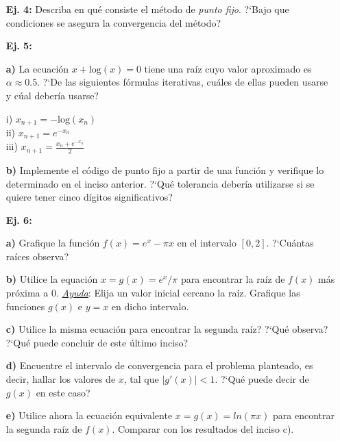 \documentclass[11pt]{article}
\begin{document}
\begin{itemize}
\item[{\bf Ej. 4:}] Describa en qu\'e consiste el m\'etodo de \textit{punto fijo}. ?`Bajo que condiciones se asegura la convergencia del m\'etodo?

\item[{\bf Ej. 5:}] 

\item [{\bf a)}] La ecuaci\'on $x + \mathrm{log}(x) = 0$ tiene una ra\'iz cuyo valor aproximado es $\alpha \approx 0.5$. ?`De las siguientes f\'ormulas iterativas, cu\'ales de ellas pueden usarse y c\'ual deber\'ia usarse?
  
     i) $x_{n+1} = -\mathrm{log}(x_{n})$\\
    ii) $x_{n+1} = e^{-x_{n}}$\\
   iii) $x_{n+1} = \frac{x_{n} + e^{-x_{n}}}{2}$

\item [{\bf b)}] Implemente el c\'odigo de punto fijo a partir de una funci\'on y verifique lo determinado en el inciso anterior. ?`Qu\'e tolerancia deber\'ia utilizarse si se quiere tener cinco d\'igitos significativos? 

\item[{\bf Ej. 6:}] 
\item[{\bf a)}] Grafique la funci\'on $f(x)= e^x-\pi x$ en el intervalo $[0,2]$. ?`Cu\'antas ra\'ices observa?

\item[{\bf b)}] Utilice la equaci\'on $x=g(x)=e^x{/}\pi$ para encontrar la ra\'iz de $f(x)$ m\'as pr\'oxima a $0$. \underline{\textit{Ayuda}}: Elija un valor inicial cercano la ra\'iz. Grafique las funciones $g(x)$ e $y=x$ en dicho intervalo.

\item[{\bf c)}] Utilice la misma ecuaci\'on para encontrar la segunda ra\'iz? ?`Qu\'e observa? ?`Qu\'e puede concluir de este \'ultimo inciso?

\item[{\bf d)}] Encuentre el intervalo de convergencia para el problema planteado, es decir, hallar los valores de $x$, tal que $|g'(x)|<1$. ?`Qu\'e puede decir de $g(x)$ en este caso?

\item[{\bf e)}] Utilice ahora la ecuaci\'on equivalente $x=g(x)=ln(\pi x)$ para encontrar la segunda ra\'iz de $f(x)$. Comparar con los resultados del inciso c). 

\end{itemize}
\end{document}
